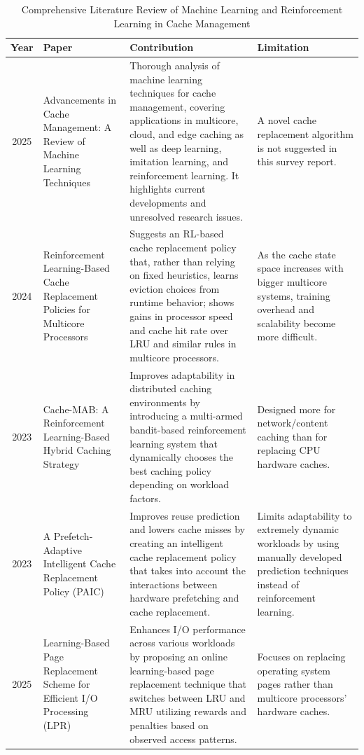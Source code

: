 \documentclass[conference]{IEEEtran}
\begin{document}
\begin{table}[!t]
\centering
\caption{Comprehensive Literature Review of Machine Learning and Reinforcement Learning in Cache Management}
\label{tab:literature_review}
\scriptsize
\renewcommand{\arraystretch}{1.0}
\setlength{\tabcolsep}{4pt}
\begin{tabularx}{\textwidth}{c p{3.8cm} X X}
\toprule
\textbf{Year} & \textbf{Paper} & \textbf{Contribution} & \textbf{Limitation} \\
\midrule
2025 & Advancements in Cache Management: A Review of Machine Learning Techniques~\cite{survey2025cache} & Thorough analysis of machine learning techniques for cache management, covering applications in multicore, cloud, and edge caching as well as deep learning, imitation learning, and reinforcement learning. It highlights current developments and unresolved research issues. & A novel cache replacement algorithm is not suggested in this survey report. \\
\midrule
2024 & Reinforcement Learning-Based Cache Replacement Policies for Multicore Processors~\cite{rlmulticore2024} & Suggests an RL-based cache replacement policy that, rather than relying on fixed heuristics, learns eviction choices from runtime behavior; shows gains in processor speed and cache hit rate over LRU and similar rules in multicore processors. & As the cache state space increases with bigger multicore systems, training overhead and scalability become more difficult. \\
\midrule
2023 & Cache-MAB: A Reinforcement Learning-Based Hybrid Caching Strategy~\cite{cachemab2023} & Improves adaptability in distributed caching environments by introducing a multi-armed bandit-based reinforcement learning system that dynamically chooses the best caching policy depending on workload factors. & Designed more for network/content caching than for replacing CPU hardware caches. \\
\midrule
2023 & A Prefetch-Adaptive Intelligent Cache Replacement Policy (PAIC)~\cite{paic2023} & Improves reuse prediction and lowers cache misses by creating an intelligent cache replacement policy that takes into account the interactions between hardware prefetching and cache replacement. & Limits adaptability to extremely dynamic workloads by using manually developed prediction techniques instead of reinforcement learning. \\
\midrule
2025 & Learning-Based Page Replacement Scheme for Efficient I/O Processing (LPR)~\cite{lpr2025} & Enhances I/O performance across various workloads by proposing an online learning-based page replacement technique that switches between LRU and MRU utilizing rewards and penalties based on observed access patterns. & Focuses on replacing operating system pages rather than multicore processors' hardware caches. \\

\end{tabularx}
\end{table}
\end{document}
